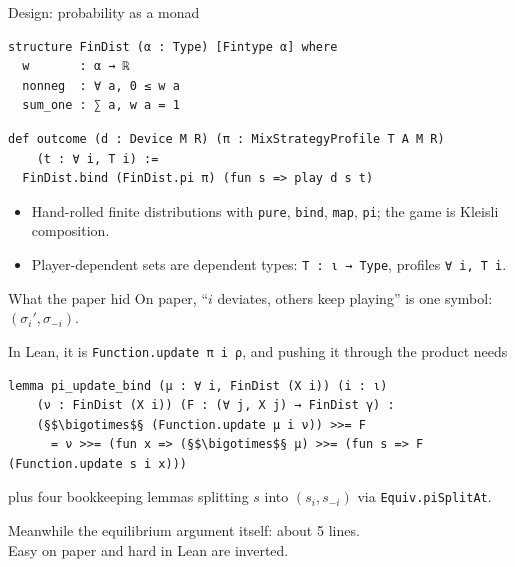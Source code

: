\documentclass{beamer}
\newcommand{\muted}[1]{{\color{dimgray}#1}}
\begin{document}
\begin{frame}[fragile]{Design: probability as a monad}
\begin{verbatim}
structure FinDist (α : Type) [Fintype α] where
  w       : α → ℝ
  nonneg  : ∀ a, 0 ≤ w a
  sum_one : ∑ a, w a = 1
\end{verbatim}

\begin{verbatim}
def outcome (d : Device M R) (π : MixStrategyProfile T A M R)
    (t : ∀ i, T i) :=
  FinDist.bind (FinDist.pi π) (fun s => play d s t)
\end{verbatim}

  \vspace{0.4em}
  \begin{itemize}\setlength\itemsep{0.6em}
    \item Hand-rolled finite distributions with \texttt{pure}, \texttt{bind}, \texttt{map}, \texttt{pi}; the game is Kleisli composition.
    \item Player-dependent sets are dependent types: \mbox{\texttt{T : ι → Type}}, profiles \mbox{\texttt{∀ i, T i}}.
  \end{itemize}
\end{frame}

\begin{frame}[fragile]{What the paper hid}
  On paper, ``$i$ deviates, others keep playing'' is one symbol: $(\sigma_i', \sigma_{-i})$.

  \vspace{0.4em}
  In Lean, it is \texttt{Function.update π i ρ}, and pushing it through the product needs
\begin{verbatim}
lemma pi_update_bind (μ : ∀ i, FinDist (X i)) (i : ι)
    (ν : FinDist (X i)) (F : (∀ j, X j) → FinDist γ) :
    (§$\bigotimes$§ (Function.update μ i ν)) >>= F
      = ν >>= (fun x => (§$\bigotimes$§ μ) >>= (fun s => F (Function.update s i x)))
\end{verbatim}
  \muted{plus four bookkeeping lemmas splitting $s$ into $(s_i, s_{-i})$ via \texttt{Equiv.piSplitAt}.}

  \vspace{0.8em}
  Meanwhile the equilibrium argument itself: \alert{about 5 lines}.\\
  \muted{Easy on paper and hard in Lean are inverted.}
\end{frame}
\end{document}
